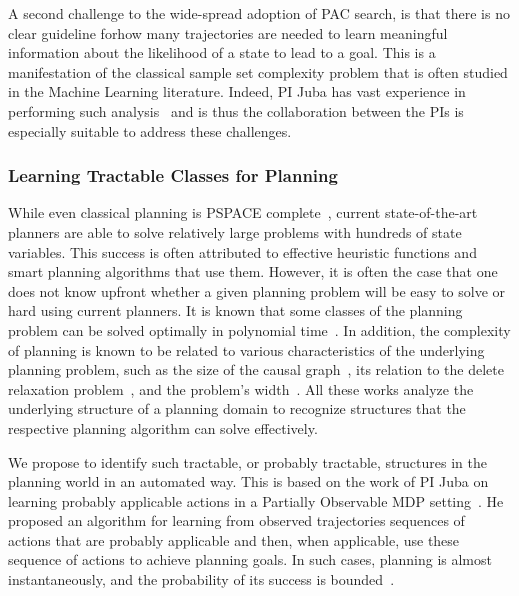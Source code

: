 \documentclass[12pt]{article}
\begin{document}
A second challenge to the wide-spread adoption of PAC search, is that there is no clear guideline forhow many trajectories are needed to learn meaningful information about the likelihood of a state to lead to a goal. This is a manifestation of the classical sample set complexity problem that is often studied in the Machine Learning literature. Indeed, PI Juba has vast experience in performing such analysis~\cite{BrendanCanYouPutHereSomeOfYourWork} and is thus the collaboration between the PIs is especially suitable to address these challenges. 


\subsubsection{Learning Tractable Classes for Planning}
While even classical planning is PSPACE complete~\cite{bylander1994computational}, 
current state-of-the-art planners are able to solve relatively large problems with hundreds of state variables. This success is often attributed to effective heuristic functions and smart planning algorithms that use them. However, it is often the case that one does not know upfront whether a given planning problem will be easy to solve or hard using current planners. It is known that some classes of the planning problem can be solved optimally in polynomial time~\cite{katz2008new}. In addition, the complexity of planning is known to be related to various characteristics of the underlying planning problem, such as the size of the causal graph~\cite{gimenez2012influence}, its relation to the delete relaxation problem~\cite{hoffmann2011analyzing}, and the problem's width~\cite{lipovetzky2012width}. All these works analyze the underlying structure of a planning domain to recognize structures that the respective planning algorithm can solve effectively. %

We propose to identify such tractable, or probably tractable, structures in the planning world in an automated way. This is based on the work of PI Juba on learning probably applicable 
actions in a Partially Observable MDP setting~\cite{juba2016jmlr}. He proposed 
an algorithm for learning from observed trajectories sequences of actions that are probably applicable and then, when applicable, use these sequence of actions to achieve planning goals. 
In such cases, planning is almost instantaneously, and the probability of its success is bounded~\cite{juba2016jmlr}. 
\end{document}
